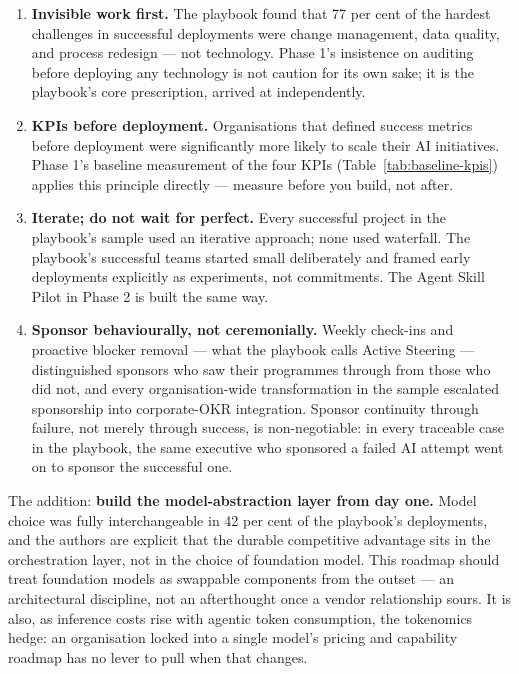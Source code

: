 \begin{enumerate}
  \item \textbf{Invisible work first.} The playbook found that 77 per cent of the hardest challenges in successful deployments were change management, data quality, and process redesign --- not technology. Phase 1's insistence on auditing before deploying any technology is not caution for its own sake; it is the playbook's core prescription, arrived at independently.
  \item \textbf{KPIs before deployment.} Organisations that defined success metrics before deployment were significantly more likely to scale their AI initiatives. Phase 1's baseline measurement of the four KPIs (Table~\ref{tab:baseline-kpis}) applies this principle directly --- measure before you build, not after.
  \item \textbf{Iterate; do not wait for perfect.} Every successful project in the playbook's sample used an iterative approach; none used waterfall. The playbook's successful teams started small deliberately and framed early deployments explicitly as experiments, not commitments. The Agent Skill Pilot in Phase 2 is built the same way.
  \item \textbf{Sponsor behaviourally, not ceremonially.} Weekly check-ins and proactive blocker removal --- what the playbook calls Active Steering --- distinguished sponsors who saw their programmes through from those who did not, and every organisation-wide transformation in the sample escalated sponsorship into corporate-OKR integration. Sponsor continuity through failure, not merely through success, is non-negotiable: in every traceable case in the playbook, the same executive who sponsored a failed AI attempt went on to sponsor the successful one.
\end{enumerate}

The addition: \textbf{build the model-abstraction layer from day one.} Model choice was fully interchangeable in 42 per cent of the playbook's deployments, and the authors are explicit that the durable competitive advantage sits in the orchestration layer, not in the choice of foundation model. This roadmap should treat foundation models as swappable components from the outset --- an architectural discipline, not an afterthought once a vendor relationship sours. It is also, as inference costs rise with agentic token consumption, the tokenomics hedge: an organisation locked into a single model's pricing and capability roadmap has no lever to pull when that changes.

